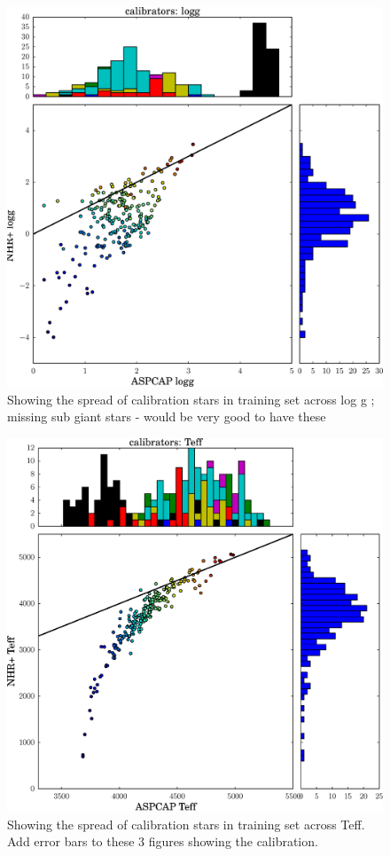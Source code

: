 \documentclass[12pt, preprint]{aastex}
\begin{document}
\begin{figure}[h!]
  \includegraphics[width=\hsize]{./plots/cal_logg.eps}
\caption{Showing the spread of calibration stars in training set across log g ; missing sub giant stars - would be very good to have these }
\label{fig:cal_g}
\end{figure}

\begin{figure}[h!]
  \includegraphics[width=\hsize]{./plots/cal_teff.eps}
\caption{Showing the spread of calibration stars in training set across Teff. Add error bars to these 3 figures showing the calibration.  }
\label{fig:cal_teff}
\end{figure}
\end{document}
